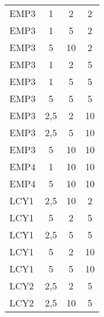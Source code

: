 \documentclass{tPRS2e}
\begin{document}
\begin{table}[h]
{\begin{tabular}{l|ccc}
			EMP3 & 1                                  & 2                           & 2                           \\
			EMP3 & 1                                  & 5                           & 2                           \\
			EMP3 & 5                                  & 10                          & 2                           \\
			EMP3 & 1                                  & 2                           & 5                           \\
			EMP3 & 1                                  & 5                           & 5                           \\
			EMP3 & 5                                  & 5                           & 5                           \\
			EMP3 & 2,5                                & 2                           & 10                          \\
			EMP3 & 2,5                                & 5                           & 10                          \\
			EMP3 & 5                                  & 10                          & 10                          \\
			EMP4 & 1                                  & 10                          & 10                          \\
			EMP4 & 5                                  & 10                          & 10                          \\
			LCY1 & 2,5                                & 10                          & 2                           \\
			LCY1 & 5                                  & 2                           & 5                           \\
			LCY1 & 2,5                                & 5                           & 5                           \\
			LCY1 & 5                                  & 2                           & 10                          \\
			LCY1 & 5                                  & 5                           & 10                          \\
			LCY2 & 2,5                                & 2                           & 5                           \\
			LCY2 & 2,5                                & 10                          & 5                           \\

\end{tabular}}
\end{table}
\end{document}
